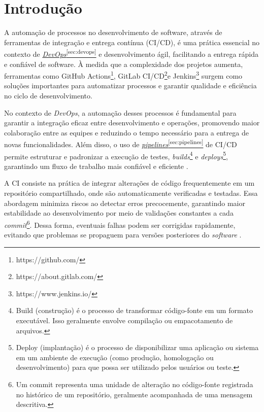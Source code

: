 
\chapter{Introdução}\label{cap:introducao}

A automação de processos no desenvolvimento de software, através de ferramentas de integração e entrega contínua (CI/CD), é uma prática essencial no contexto de \hyperref[sec:devops]{\textit{DevOps}\textsuperscript{\ref{sec:devops}}} e desenvolvimento ágil, facilitando a entrega rápida e confiável de software. À medida que a complexidade dos projetos aumenta, ferramentas como GitHub Actions\footnote{https://github.com/}, GitLab CI/CD\footnote{https://about.gitlab.com/}e Jenkins\footnote{https://www.jenkins.io/} surgem como soluções importantes para automatizar processos e garantir qualidade e eficiência no ciclo de desenvolvimento.

No contexto de \textit{DevOps}, a automação desses processos é fundamental para garantir a integração eficaz entre desenvolvimento e operações, promovendo maior colaboração entre as equipes e reduzindo o tempo necessário para a entrega de novas funcionalidades. Além disso, o uso de \hyperref[sec:pipelines]{\textit{pipelines}\textsuperscript{\ref{sec:pipelines}}} de CI/CD permite estruturar e padronizar a execução de testes, \textit{builds}\footnote{Build (construção) é o processo de transformar código-fonte em um formato executável. Isso geralmente envolve compilação ou empacotamento de arquivos.} e \textit{deploys}\footnote{Deploy (implantação) é o processo de disponibilizar uma aplicação ou sistema em um ambiente de execução (como produção, homologação ou desenvolvimento) para que possa ser utilizado pelos usuários ou teste.}, garantindo um fluxo de trabalho mais confiável e eficiente \cite{AWS2024}.

A CI consiste na prática de integrar alterações de código frequentemente em um repositório compartilhado, onde são automaticamente verificadas e testadas. Essa abordagem minimiza riscos ao detectar erros precocemente, garantindo maior estabilidade ao desenvolvimento por meio de validações constantes a cada \textit{commit}\footnote{Um commit representa uma unidade de alteração no código-fonte registrada no histórico de um repositório, geralmente acompanhada de uma mensagem descritiva.}. Dessa forma, eventuais falhas podem ser corrigidas rapidamente, evitando que problemas se propaguem para versões posteriores do \textit{software} \cite{Fowler2024}.

